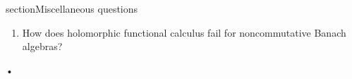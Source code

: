 
section{Miscellaneous questions}
\begin{enumerate}
\item
How does holomorphic functional calculus fail for noncommutative Banach algebras?
\end{enumerate}•